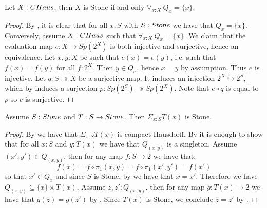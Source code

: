 \begin{lemma}\label{StoneCompactHausdorffTotallyDisconnected}
Let $X:\CHaus$, then $X$ is Stone if and only $\forall_{x:X}\ Q_x=\{x\}$.
\end{lemma}

\begin{proof}
  By , it is clear that for all $x:S$ with $S:\Stone$ we have that $Q_x=\{x\}$.
%
  Conversely, assume $X:\CHaus$ such that $\forall_{x:X}\ Q_x = \{x\}$.
  We claim that the evaluation map $e:X \to Sp(2^X)$ is both injective and surjective, hence an equivalence. 
    Let $x,y:X$ be such that $e(x)=e(y)$, i.e. such that $f(x) = f(y)$ for all $f:2^X$. Then $y \in Q_x$, hence $x=y$ by assumption. Thus $e$ is injective. 
    Let $q:S\twoheadrightarrow X$ be a surjective map. 
    It induces an injection $2^X \hookrightarrow 2^S$, which by 
    induces a surjection $p:Sp(2^S) \twoheadrightarrow Sp(2^X)$. 
    Note that $e\circ q$ is equal to $p$ so $e$ is surjective. 
%
%
%
\end{proof}

\begin{theorem}
  \label{stone-sigma-closed}
Assume $S:\Stone$ and $T:S\to\Stone$. Then $\Sigma_{x:S}T(x)$ is Stone.
\end{theorem}

\begin{proof}
By  we have that $\Sigma_{x:S}T(x)$ is compact Hausdorff. 
By  
it is enough to show that for all $x:S$ and $y:T(x)$ 
we have that $Q_{(x,y)}$ is a singleton.
%
Assume $(x',y')\in Q_{(x,y)}$, then for any map $f:S\to 2$ we have that:
\[ f(x) = f\circ \pi_1(x,y) = f\circ \pi_1(x',y') = f(x')\]
so that $x'\in Q_x$ and since $S$ is Stone, by  we have that $x=x'$.
%
Therefore we have $Q_{(x,y)}\subseteq \{x\}\times T(x)$. 
Assume $z,z':Q_{(x,y)}$, then for any map $g:T(x)\to 2$ we have that $g(z)=g(z')$ by 
. Since $T(x)$ is Stone, 
we conclude $z=z'$ by .
\end{proof}


